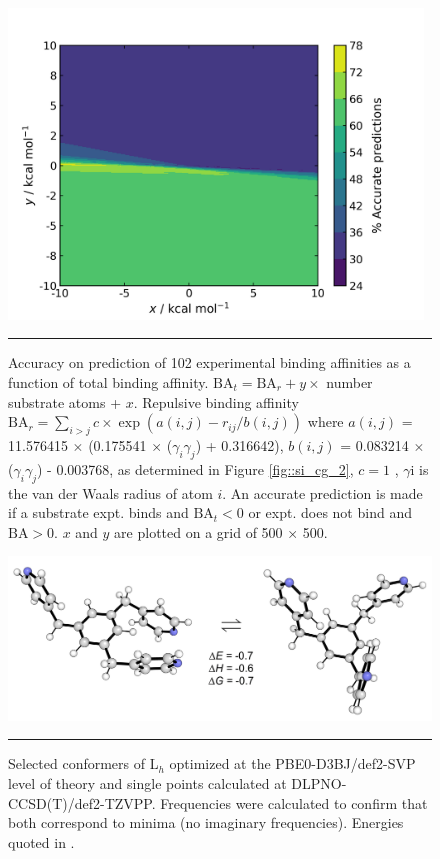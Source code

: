 \documentclass[../../main.tex]{subfiles}
\begin{document}
\begin{figure}[h!]
	\vspace{0.4cm}
	\centering
	\includegraphics[width=11cm]{3/cgbind/figs/figS4}
	\vspace{0.2cm}
	\hrule
	\caption{Accuracy on prediction of 102 experimental binding affinities as a function of total binding affinity. $\text{BA}_t = \text{BA}_r + y \times$ number substrate atoms + $x$. Repulsive binding affinity $\text{BA}_r = \sum_{i>j} c \times \exp(a(i, j) - r_{ij}/b(i, j))$ where $a(i, j)$ = 11.576415 $\times$ (0.175541 $\times$ ($\gamma_i \gamma_j$) + 0.316642), $b(i, j)$ = 0.083214 $\times$ ($\gamma_i \gamma_j$) - 0.003768, as determined in Figure \ref{fig::si_cg_2}, $c = 1$ \kcal, $\gamma$i is the van der Waals radius of atom $i$. An accurate prediction is made if a substrate expt. binds and $\text{BA}_{t} < 0$ or expt. does not bind and $\text{BA} > 0$. $x$ and $y$ are plotted on a grid of 500 × 500.}
	\label{fig::sicg_4}
\end{figure}


\begin{figure}[h!]
	\vspace{0.4cm}
	\centering
	\includegraphics[width=13cm]{3/cgbind/figs/figS5}
	\vspace{0.2cm}
	\hrule
	\caption{Selected conformers of L$_h$ optimized at the PBE0-D3BJ/def2-SVP level of theory and single points calculated at DLPNO-CCSD(T)/def2-TZVPP. Frequencies were calculated to confirm that both correspond to minima (no imaginary frequencies). Energies quoted in \kcal.}
	\label{fig::si_cg_5}
\end{figure}
\end{document}
